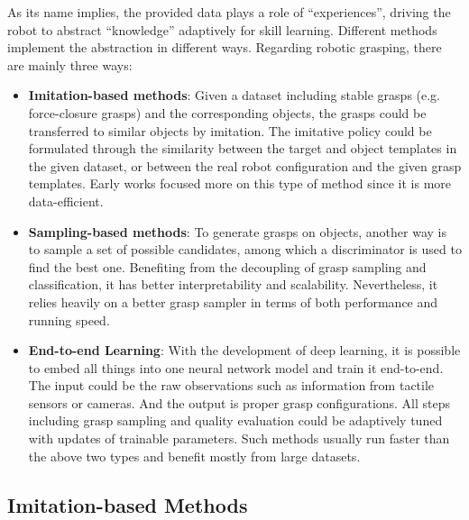 \documentclass[letterpaper,10pt]{article}
\begin{document}
As its name implies, the provided data plays a role of ``experiences'', driving the robot to abstract ``knowledge'' adaptively for skill learning.
Different methods implement the abstraction in different ways.
Regarding robotic grasping, there are mainly three ways:
\begin{itemize}
	\item {\bf Imitation-based methods}: Given a dataset including stable grasps (e.g. force-closure grasps) and the corresponding objects, the grasps could be transferred to similar objects by imitation. The imitative policy could be formulated through the similarity between the target and object templates in the given dataset, or between the real robot configuration and the given grasp templates. Early works focused more on this type of method since it is more data-efficient.
	\item {\bf Sampling-based methods}: To generate grasps on objects, another way is to sample a set of possible candidates, among which a discriminator is used to find the best one. Benefiting from the decoupling of grasp sampling and classification, it has better interpretability and scalability. Nevertheless, it relies heavily on a better grasp sampler in terms of both performance and running speed.
	\item {\bf End-to-end Learning}: With the development of deep learning, it is possible to embed all things into one neural network model and train it end-to-end. The input could be the raw observations such as information from tactile sensors or cameras. And the output is proper grasp configurations. All steps including grasp sampling and quality evaluation could be adaptively tuned with updates of trainable parameters. Such methods usually run faster than the above two types and benefit mostly from large datasets.
\end{itemize}

\subsection{Imitation-based Methods}
\end{document}
